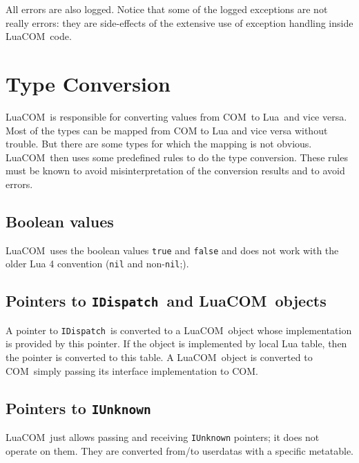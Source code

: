 \documentclass[11pt,a4paper,english]{report}
\newcommand{\ident}[1]{\mbox{\texttt{#1}}}
\newcommand{\techname}[1]{\mbox{#1}}
\newcommand{\lua}{\techname{Lua}}
\newcommand{\com}{\techname{COM}}
\newcommand{\luacom}{\techname{LuaCOM}}
\newcommand{\idispatch}{\ident{IDispatch}}
\begin{document}
All errors are also logged. Notice that some of the logged exceptions
are not really errors: they are side-effects of the extensive use of
exception handling inside \luacom\ code.






\section{Type Conversion}
\label{sect:type_conv}


\luacom\ is responsible for converting values from \com\ to \lua\ and
vice versa. Most of the types can be mapped from COM to Lua and vice
versa without trouble. But there are some types for which the mapping
is not obvious. \luacom\ then uses some predefined rules to do the
type conversion. These rules must be known to avoid misinterpretation
of the conversion results and to avoid errors.



\subsection{Boolean values}
\label{subsect:boolean}

\luacom\ uses the boolean values \verb+true+ and \verb+false+ and
does not work with the older Lua 4 convention (\verb+nil+ and
non-\verb+nil+;).

\subsection{Pointers to \idispatch\ and \luacom\ objects}

A pointer to \idispatch\ is converted to a \luacom\ object whose
implementation is provided by this pointer. If the object is implemented by local
Lua table, then the pointer is converted to this table. A \luacom\ object is
converted to \com\ simply passing its interface implementation to
\com.


\subsection{Pointers to \ident{IUnknown}}

\luacom\ just allows passing and receiving \ident{IUnknown} pointers;
it does not operate on them. They are converted from/to userdatas with a
specific metatable.
\end{document}
